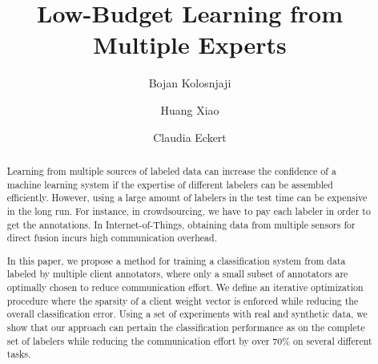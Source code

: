 \documentclass{llncs}
\begin{document}
%
\frontmatter          %
%
%
\mainmatter              %
%
\title{ Low-Budget Learning from Multiple Experts}
%
%
\author{Bojan  Kolosnjaji \and Huang Xiao 
	\and Claudia Eckert }
%
%
%

\maketitle              %

\begin{abstract}
Learning from multiple sources of labeled data can increase the confidence of a machine learning system if the expertise of different labelers can be assembled efficiently. However, using a large amount of labelers in the test time can be expensive in the long run. For instance, in crowdsourcing, we have to pay each labeler in order to get the annotations. In Internet-of-Things, obtaining data from multiple sensors for direct fusion incurs high communication overhead. 

In this paper, we propose a method for training a classification system from data labeled by multiple client annotators, where only a small subset of annotators are optimally chosen to reduce communication effort. 
We define an iterative optimization procedure where the sparsity of a client weight vector is enforced while reducing the overall classification error. Using a set of experiments with real and synthetic data, we show that our approach can pertain the classification performance as on the complete set of labelers while reducing the communication effort by over 70\% on several different tasks.

\end{abstract}
%
\end{document}
